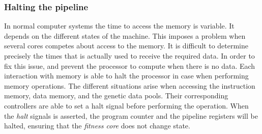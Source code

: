 \subsubsection{Halting the pipeline}
In normal computer systems the time to access the memory is variable. It depends on the different states of the machine. This imposes a problem when several cores competes about access to the memory. It is difficult to determine precisely the times that is actually used to receive the required data. In order to fix this issue, and prevent the processor to compute when there is no data. Each interaction with memory is able to halt the processor in case when performing memory operations. The different situations arise when accessing the instruction memory, data memory, and the genetic data pools. Their corresponding controllers are able to set a halt signal before performing the operation. When the \emph{halt} signals is asserted, the program counter and the pipeline registers will be halted, ensuring that the \emph{fitness core} does not change state. 






